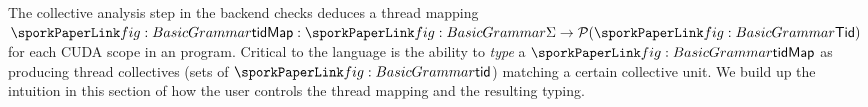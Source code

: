 
The collective analysis step in the backend checks deduces a thread mapping $\sporktidMap: \sporkSigma \to \mathcal{P}(\sporkTid)$ for each CUDA scope in an \sporkName{} program.
Critical to the language is the ability to \emph{type} a $\sporktidMap$ as producing thread collectives (sets of $\sporktid$) matching a certain collective unit.
We build up the intuition in this section of how the user controls the thread mapping and the resulting typing.





